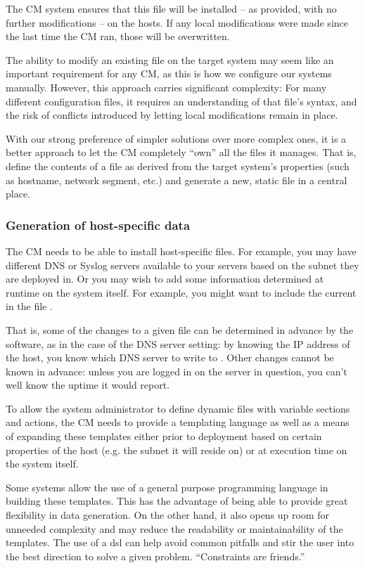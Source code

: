 The CM system ensures that this file will be installed
-- as provided, with no further modifications -- on
the hosts.  If any local modifications were made since
the last time the CM ran, those will be overwritten.

The ability to modify an existing file on the target
system may seem like an important requirement for any
CM, as this is how we configure our systems manually.
However, this approach carries significant complexity:
For many different configuration files, it requires an
understanding of that file's syntax, and the risk of
conflicts introduced by letting local modifications
remain in place.  

With our strong preference of simpler solutions over
more complex ones, it is a better approach to let the
CM completely ``own'' all the files it manages.  That
is, define the contents of a file as derived from the
target system's properties (such as hostname, network
segment, etc.) and generate a new, static file in a
central place.

\subsubsection*{Generation of host-specific data}

The CM needs to be able to install host-specific
files.  For example, you may have different DNS or
Syslog servers available to your servers based on the
subnet they are deployed in.  Or you may wish to add
some information determined at runtime on the system
itself. For example, you might want to include the
current  in the file
.

That is, some of the changes to a given file can be
determined in advance by the software, as in the case
of the DNS server setting: by knowing the IP address
of the host, you know which DNS server to write to
.  Other changes cannot be
known in advance: unless you are logged in on the
server in question, you can't well know the uptime it
would report.

To allow the system administrator to define dynamic
files with variable sections and actions, the CM needs
to provide a templating language as well as a means of
expanding these templates either prior to deployment
based on certain properties of the host (e.g. the
subnet it will reside on) or at execution time on the
system itself.

Some systems allow the use of a general purpose
programming language in building these templates.
This has the advantage of being able to provide great
flexibility in data generation.  On the other hand, it
also opens up room for unneeded complexity and may
reduce the readability or maintainability of the
templates.  The use of a \gls{dsl} can help avoid
common pitfalls and stir the user into the best
direction to solve a given problem.  ``Constraints are
friends.''\cite{configuration-management:brooks-design}

